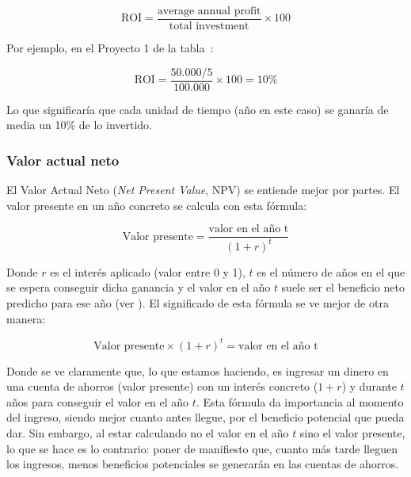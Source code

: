 \documentclass[12pt]{article}
\begin{document}
\begin{equation}
    \text{ROI} = \frac{\text{average annual profit}}{\text{total investment}} \times 100
\end{equation}

\newpage
{Por ejemplo, en el Proyecto 1 de la tabla~:}

\begin{equation}
    \text{ROI} = \frac{50.000/5}{100.000} \times 100 = 10\%
\end{equation} \smallskip

{Lo que significaría que cada unidad de tiempo (año en este caso) se ganaría de media un 10\% de lo invertido.}

\subsubsection{Valor actual neto}
\label{2.5.4}

{El Valor Actual Neto (\textit{Net Present Value}, NPV) se entiende mejor por partes. El valor presente en un año concreto se calcula con esta fórmula:}

\begin{equation}
    \text{Valor presente} = \frac{\text{valor en el año t}}{(1+r)^t}
\end{equation} \smallskip

{Donde $r$ es el interés aplicado (valor entre 0 y 1), $t$ es el número de años en el que se espera conseguir dicha ganancia y el valor en el año $t$ suele ser el beneficio neto predicho para ese año (ver ). El significado de esta fórmula se ve mejor de otra manera:}

\begin{equation}
    \text{Valor presente} \times (1 + r)^t = \text{valor en el año t}
\end{equation} \smallskip

{Donde se ve claramente que, lo que estamos haciendo, es ingresar un dinero en una cuenta de ahorros (valor presente) con un interés concreto ($1 + r$) y durante $t$ años para conseguir el valor en el año $t$. Esta fórmula da importancia al momento del ingreso, siendo mejor cuanto antes llegue, por el beneficio potencial que pueda dar. Sin embargo, al estar calculando no el valor en el año $t$ sino el valor presente, lo que se hace es lo contrario: poner de manifiesto que, cuanto más tarde lleguen los ingresos, menos beneficios potenciales se generarán en las cuentas de ahorros.} \bigskip
\end{document}
